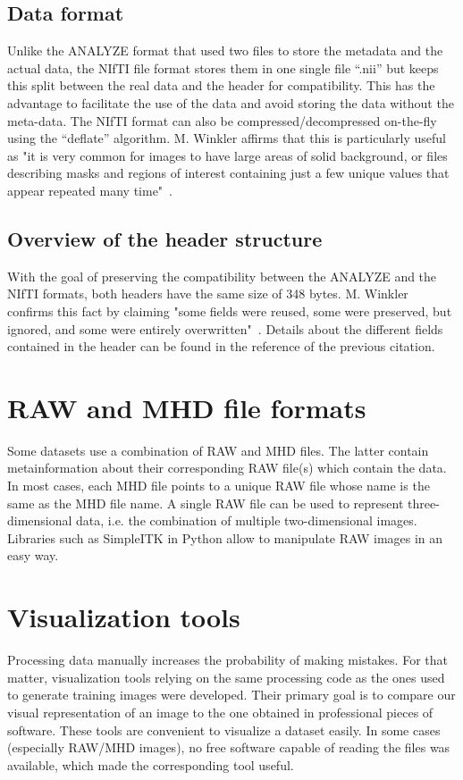 \subsection{Data format}
\setlength{\marginparwidth}{3cm}\leavevmode {}Unlike the ANALYZE format that used two files to store the metadata and the actual data, the NIfTI file format stores them in one single file “.nii” but keeps this split between the real data and the header for compatibility. This has the advantage to facilitate the use of the data and avoid storing the data without the meta-data. The NIfTI format can also be compressed/decompressed on-the-fly using the “deflate” algorithm. M. Winkler affirms that this is particularly useful as "it is very common for images to have large areas of solid background, or files describing masks and regions of interest containing just a few unique values that appear repeated many time"~\cite{52}.


\subsection{Overview of the header structure}
\setlength{\marginparwidth}{3cm}\leavevmode {}With the goal of preserving the compatibility between the ANALYZE and the NIfTI formats, both headers have the same size of 348 bytes. M. Winkler confirms this fact by claiming "some fields were reused, some were preserved, but ignored, and some were entirely overwritten"~\cite{52}. Details about the different fields contained in the header can be found in the reference of the previous citation.


\section{RAW and MHD file formats}
\setlength{\marginparwidth}{3cm}\leavevmode {}Some datasets use a combination of RAW and MHD files. The latter contain metainformation about their corresponding RAW file(s) which contain the data. In most cases, each MHD file points to a unique RAW file whose name is the same as the MHD file name. A single RAW file can be used to represent three-dimensional data, i.e. the combination of multiple two-dimensional images. Libraries such as \mbox{SimpleITK} in Python allow to manipulate RAW images in an easy way. 



\section{Visualization tools}
\setlength{\marginparwidth}{3cm}\leavevmode {}
Processing data manually increases the probability of making mistakes. For that matter, visualization tools relying on the same processing code as the ones used to generate training images were developed. Their primary goal is to compare our visual representation of an image to the one obtained in professional pieces of software. These tools are convenient to visualize a dataset easily. In some cases (especially RAW/MHD images), no free software capable of reading the files was available, which made the corresponding tool useful. 


